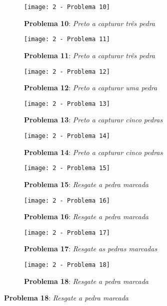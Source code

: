 \begin{figure}[p!]
    \centering
    \captionsetup{justification=raggedright,singlelinecheck=false}
    \par\bigskip
    \begin{subfigure}[t]{.3\textwidth}
        \texttt{[image: 2 - Problema 10]}
        \caption*{\textbf{Problema 10}: \emph{Preto a capturar três pedra}}
    \end{subfigure}
    \hfill
    \begin{subfigure}[t]{.3\textwidth}
        \texttt{[image: 2 - Problema 11]}
        \caption*{\textbf{Problema 11}: \emph{Preto a capturar três pedra}}
    \end{subfigure}
    \hfill
    \begin{subfigure}[t]{.3\textwidth}
        \texttt{[image: 2 - Problema 12]}
        \caption*{\textbf{Problema 12}: \emph{Preto a capturar uma pedra}}
    \end{subfigure}
    \par\bigskip
    \begin{subfigure}[t]{.3\textwidth}
        \texttt{[image: 2 - Problema 13]}
        \caption*{\textbf{Problema 13}: \emph{Preto a capturar cinco pedras}}
    \end{subfigure}
    \hfill
    \begin{subfigure}[t]{.3\textwidth}
        \texttt{[image: 2 - Problema 14]}
        \caption*{\textbf{Problema 14}: \emph{Preto a capturar cinco pedras}}
    \end{subfigure}
    \hfill
    \begin{subfigure}[t]{.3\textwidth}
        \texttt{[image: 2 - Problema 15]}
        \caption*{\textbf{Problema 15}: \emph{Resgate a pedra marcada}}
    \end{subfigure}
    \par\bigskip
    \begin{subfigure}[t]{.3\textwidth}
        \texttt{[image: 2 - Problema 16]}
        \caption*{\textbf{Problema 16}: \emph{Resgate a pedra marcada}}
    \end{subfigure}
    \hfill
    \begin{subfigure}[t]{.3\textwidth}
        \texttt{[image: 2 - Problema 17]}
        \caption*{\textbf{Problema 17}: \emph{Resgate as pedras marcadas}}
    \end{subfigure}
    \hfill
    \begin{subfigure}[t]{.3\textwidth}
        \texttt{[image: 2 - Problema 18]}
        \caption*{\textbf{Problema 18}: \emph{Resgate a pedra marcada}}
    \end{subfigure}
\end{figure}


